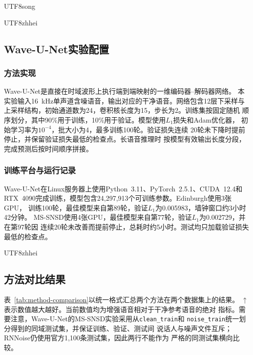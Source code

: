 \documentclass[10.5pt,compsoc]{CjC}
\theoremstyle{mystyle}
\begin{document}
\begin{CJK*}{UTF8}{song}
{\begin{CJK*}{UTF8}{zhhei}\subsection{Wave-U-Net实验配置}\end{CJK*}}
\label{subsec:waveunet-configuration}

\subsubsection{方法实现}

Wave-U-Net是直接在时域波形上执行端到端映射的一维编码器--解码器网络。
本实验输入16~kHz单声道含噪语音，输出对应的干净语音。网络包含12层下采样与
上采样结构，初始通道数为24，卷积核长度为15，步长为2。训练集按固定随机
顺序划分，其中90\%用于训练，10\%用于验证。模型使用$L_1$损失和Adam优化器，
初始学习率为$10^{-4}$，批大小为4，最多训练100轮。验证损失连续
20轮未下降时提前停止，并保留验证损失最低的检查点。长语音推理时
按模型有效输出长度分段，完成预测后按时间顺序拼接。

\subsubsection{训练平台与运行记录}

Wave-U-Net在Linux服务器上使用Python~3.11、PyTorch~2.5.1、CUDA~12.4和
RTX~4090完成训练，模型包含24,297,913个可训练参数。Edinburgh使用3张GPU，
训练100轮，最佳模型来自第89轮，验证$L_1$为0.005983，墙钟窗口约3小时42分钟。
MS-SNSD使用4张GPU，最佳模型来自第77轮，验证$L_1$为0.002729，并在第97轮因
连续20轮未改善而提前停止，总耗时约5小时。测试均只加载验证损失最低的检查点。

{\begin{CJK*}{UTF8}{zhhei}\subsection{方法对比结果}\end{CJK*}}
\label{subsec:comparison-results}

表~\ref{tab:method-comparison}以统一格式汇总两个方法在两个数据集上的结果。
$\uparrow$表示数值越大越好。当前数值均为增强语音相对于干净参考语音的绝对
指标。需要注意，Wave-U-Net的MS-SNSD实验采用从\texttt{clean\_train}和
\texttt{noise\_train}统一划分得到的同域测试集，并保证训练、验证、测试间
说话人与噪声文件互斥；RNNoise仍使用官方1,100条测试集，因此两行不能作为
严格的同测试集横向比较。


\end{CJK*}
\end{document}
